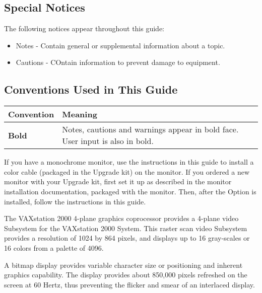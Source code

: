\documentclass{dec}
\begin{document}
\subsection*{Special Notices}
The following notices appear throughout this guide:

\begin{itemize}
	\item Notes - Contain general or supplemental information about a topic.
	\item Cautions - COntain information to prevent damage to equipment.
\end{itemize}

\subsection*{Conventions Used in This Guide}

\begin{tabular}{m{3cm} m{7.5cm}}
\hline
\textbf{Convention} & \textbf{Meaning} \\
\hline
\textbf{Bold} & Notes, cautions and warnings appear in bold face. User input is also in bold.\\
\hline
\end{tabular}

\newpage
\setcounter{page}{1}
\pagestyle{main}


If you have a monochrome monitor, use the instructions in this guide to
install a color cable (packaged in the Upgrade kit) on the monitor.
 If you ordered a new monitor with your Upgrade kit, first set it up as described in
the monitor installation documentation, packaged with the monitor.
 Then, after the Option is installed, follow the instructions in this guide.

The VAXstation 2000 4-plane graphics coprocessor provides a 4-plane video
Subsystem for the VAXstation 2000 System. This raster scan video Subsystem
provides a resolution of 1024 by 864 pixels, and displays up to 16 gray-scales
or 16 colors from a palette of 4096.

A bitmap display provides variable character size or positioning and inherent
graphics capability. The display provides about 850,000 pixels refreshed on
the screen at 60 Hertz, thus preventing the flicker and smear of an interlaced
display.

\end{document}
